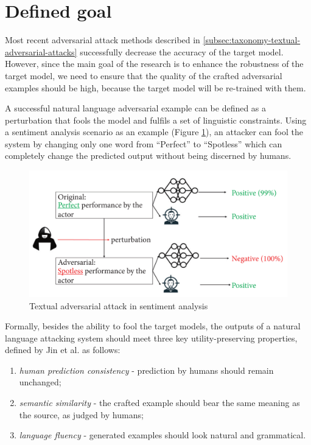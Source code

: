 
\section{Defined goal}\label{sec:defined-goal}

Most recent adversarial attack methods described in \ref{subsec:taxonomy-textual-adversarial-attacks} successfully decrease the accuracy of the target model.
However, since the main goal of the research is to enhance the robustness of the target model, we need to ensure that the quality of the crafted adversarial examples should be high, because the target model will be re-trained with them.

A successful natural language adversarial example can be defined as a perturbation that fools the model and fulfils  a set of linguistic constraints.
Using a sentiment analysis scenario as an example (Figure \ref{fig:3_adverarial_example}), an attacker can fool the system by changing only one word from “Perfect” to “Spotless” which can completely change the predicted output without being discerned by humans.


\begin{figure}[h]
  \centering
  \includegraphics[width=0.7\linewidth]{images/3_adversarial_attack.png}
  \caption{Textual adversarial attack in sentiment analysis \cite{10.1155/2022/6458488}}
  \label{fig:3_adverarial_example}
\end{figure}

Formally, besides the ability to fool the target models, the outputs of a natural language attacking system should meet three key utility-preserving properties, defined by Jin et al. \cite{journals/corr/abs-1907-11932} as follows:
\begin{enumerate}
    \item \emph{human prediction consistency} - prediction by humans should remain unchanged;
    \item \emph{semantic similarity} -  the crafted example should bear the same meaning as the source, as judged by humans;
    \item \emph{language fluency} - generated examples should look natural and grammatical.
\end{enumerate}
